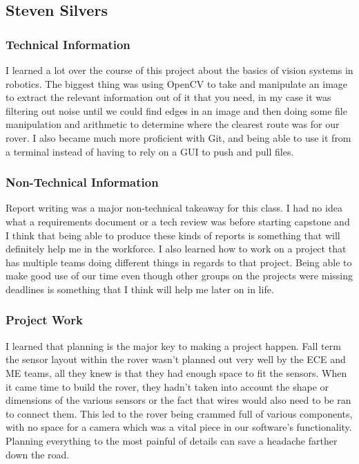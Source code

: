 \documentclass[10pt,letterpaper,onecolumn,draftclsnofoot,journal]{IEEEtran}
\begin{document}
\subsection{\textbf{Steven Silvers}}
\subsubsection{\textbf{Technical Information}}
I learned a lot over the course of this project about the basics of vision systems in robotics. The biggest thing was using OpenCV to take and manipulate an image to extract the relevant information out of it that you need, in my case it was filtering out noise until we could find edges in an image and then doing some file manipulation and arithmetic to determine where the clearest route was for our rover. I also became much more proficient with Git, and being able to use it from a terminal instead of having to rely on a GUI to push and pull files. 
\vspace{.3cm}

\subsubsection{\textbf{Non-Technical Information}}
Report writing was a major non-technical takeaway for this class. I had no idea what a requirements document or a tech review was before starting capstone and I think that being able to produce these kinds of reports is something that will definitely help me in the workforce. I also learned how to work on a project that has multiple teams doing different things in regards to that project. Being able to make good use of our time even though other groups on the projects were missing deadlines is something that I think will help me later on in life.
\vspace{.3cm}

\subsubsection{\textbf{Project Work}}
I learned that planning is the major key to making a project happen. Fall term the sensor layout within the rover wasn't planned out very well by the ECE and ME teams, all they knew is that they had enough space to fit the sensors. When it came time to build the rover, they hadn't taken into account the shape or dimensions of the various sensors or the fact that wires would also need to be ran to connect them. This led to the rover being crammed full of various components, with no space for a camera which was a vital piece in our software's functionality. Planning everything to the most painful of details can save a headache farther down the road.
\vspace{.3cm}
\end{document}
